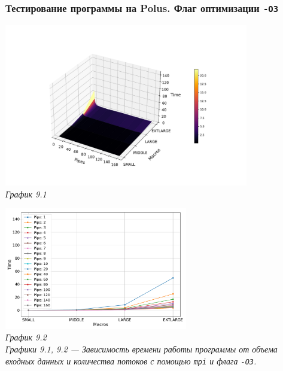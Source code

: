 \documentclass[a4paper, 11pt]{article}
\begin{document}
\subsubsection*{Тестирование программы на Polus. Флаг оптимизации \texttt{-O3}}
\begin{center}
    \includegraphics[width=0.8\textwidth]{../graph/mpi_o3.pdf} \\
    \small \it
    График 9.1
\end{center}

\begin{center}
    \includegraphics[width=0.6\textwidth]{../graph/mpi_o31.pdf} \\
    \small \it
    График 9.2\\ Графики 9.1, 9.2 --- Зависимость времени работы программы от объема входных данных и количества потоков с помощью \texttt{mpi} и флага \texttt{-O3}.
\end{center}
\end{document}
